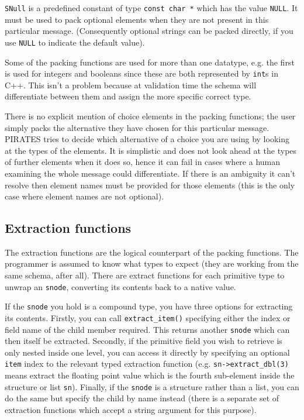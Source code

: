 \documentclass[12pt,a4paper,twoside]{article}
\renewcommand{\_}{\texttt{\symbol{95}}}
\begin{document}
\verb^SNull^ is a predefined constant of type \verb^const char *^ which
has the value \verb^NULL^. It must be used to pack
optional elements when they are not present in this particular message.
(Consequently optional strings can be packed directly, if you use
\verb^NULL^ to indicate the default value).

Some of the packing functions are used for more than one datatype,
e.g. the first is used for integers and booleans
since these are both represented by \verb^int^s in C++. This isn't
a problem because at validation time the schema will differentiate
between them and assign the more specific correct type.

There is no explicit mention of choice elements in the
packing functions; the user simply packs the alternative they have chosen for
this particular message. PIRATES tries to decide which alternative of a choice
you are using by looking at the types of the elements. It is
simplistic and does not look ahead at the types of further elements when it
does so, hence it can fail in cases where a human examining the whole message
could differentiate. If there is an ambiguity it can't resolve then
element names must be provided for those elements (this is the only
case where element names are not optional).

\subsection{Extraction functions}

The extraction functions are the logical counterpart of the packing
functions. The programmer is assumed to know what types to expect
(they are working from the same schema, after all). There are
extract functions for each primitive type to unwrap an \verb^snode^,
converting its contents back to a native value.

If the \verb^snode^ you hold is a compound type, you have three options for
extracting its contents. Firstly, you can call \verb^extract_item()^ specifying
either the index or field name of the child member required. This returns
another \verb^snode^ which can then itself be extracted. Secondly, if the
primitive field you wish to retrieve is only nested inside one level, you can
access it directly by specifying an optional \verb^item^ index to the relevant
typed extraction function (e.g. \verb^sn->extract_dbl(3)^ means extract the
floating point value which is the fourth sub-element inside the structure or
list \verb^sn^). Finally, if the \verb^snode^ is a structure rather than
a list, you can do the same but specify the child by name
instead (there is a separate set of extraction functions which accept a string
argument for this purpose).
\end{document}
